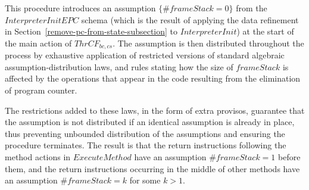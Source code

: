 This procedure introduces an assumption $\{\# frameStack = 0 \}$ from
the $InterpreterInitEPC$ schema (which is the result of applying the
data refinement in Section~\ref{remove-pc-from-state-subsection} to
$InterpreterInit$) at the start of the main action of $ThrCF_{bc,cs}$.
The assumption is then distributed throughout the process by
exhaustive application of restricted versions of standard algebraic
assumption-distribution laws, and rules stating how the size of
$frameStack$ is affected by the operations that appear in the code
resulting from the elimination of program counter.

The restrictions added to these laws, in the form of extra provisos,
guarantee that the assumption is not distributed if an identical
assumption is already in place, thus preventing unbounded distribution
of the assumptions and ensuring the procedure terminates.
The result is that the return instructions following the method
actions in $ExecuteMethod$ have an assumption $\# frameStack = 1$
before them, and the return instructions occurring in the middle of
other methods have an assumption $\# frameStack = k$ for some $k > 1$.


